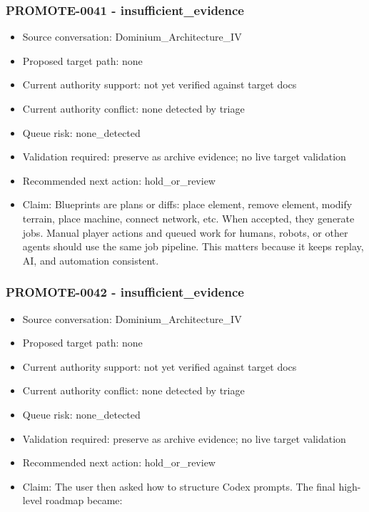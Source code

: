 \documentclass[11pt,a4paper]{report}
\begin{document}
\subsubsection{PROMOTE-0041 - insufficient\_evidence}

\begin{itemize}
\item Source conversation: Dominium\_Architecture\_IV
\item Proposed target path: none
\item Current authority support: not yet verified against target docs
\item Current authority conflict: none detected by triage
\item Queue risk: none\_detected
\item Validation required: preserve as archive evidence; no live target validation
\item Recommended next action: hold\_or\_review
\item Claim: Blueprints are plans or diffs: place element, remove element, modify terrain, place machine, connect network, etc. When accepted, they generate jobs. Manual player actions and queued work for humans, robots, or other agents should use the same job pipeline. This matters because it keeps replay, AI, and automation consistent.
\end{itemize}

\subsubsection{PROMOTE-0042 - insufficient\_evidence}

\begin{itemize}
\item Source conversation: Dominium\_Architecture\_IV
\item Proposed target path: none
\item Current authority support: not yet verified against target docs
\item Current authority conflict: none detected by triage
\item Queue risk: none\_detected
\item Validation required: preserve as archive evidence; no live target validation
\item Recommended next action: hold\_or\_review
\item Claim: The user then asked how to structure Codex prompts. The final high-level roadmap became:
\end{itemize}
\end{document}
